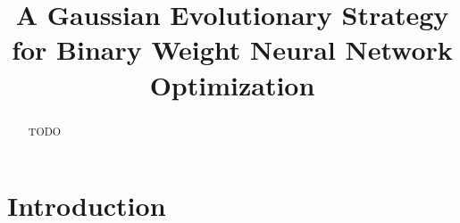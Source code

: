\documentclass[runningheads]{llncs}
\begin{document}
\title{A Gaussian Evolutionary Strategy for Binary Weight Neural Network Optimization}

\author{}
\authorrunning{}
\institute{}

\maketitle

\begin{abstract}
TODO
\end{abstract}

\section{Introduction}
\label{sec:intro}

\end{document}
